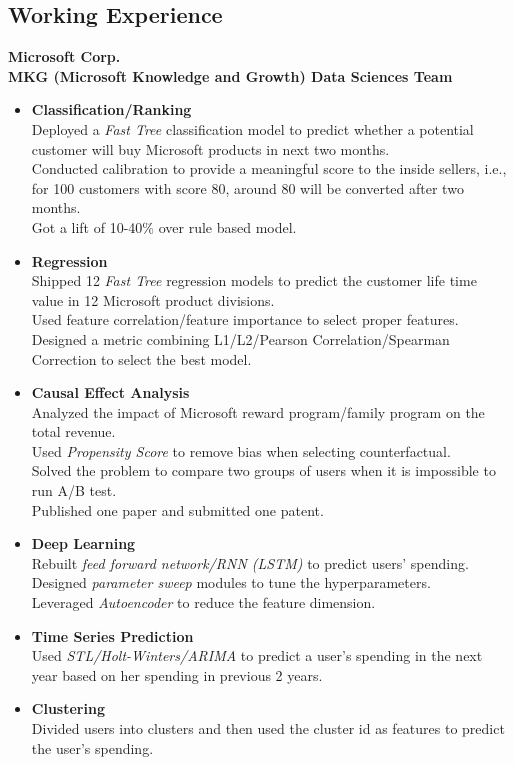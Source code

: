 \documentclass[margin,line]{res}
\begin{document}
\begin{resume}

\section{\sc Working Experience}

{\bf Microsoft Corp. }   \\ %
{\bf MKG (Microsoft Knowledge and Growth) Data Sciences Team}   \\
\begin{itemize}
  \item {\bf Classification/Ranking} \\
  Deployed a \emph{Fast Tree} classification model to predict whether a potential customer will buy Microsoft products in next two months. \\ Conducted calibration to provide a meaningful score to the inside sellers, i.e., for 100 customers with score 80, around 80 will be converted after two months. \\
  Got a lift of 10-40\% over rule based model. %
  \item {\bf Regression} \\
  Shipped 12 \emph{Fast Tree} regression models to predict the customer life time value in 12 Microsoft product divisions. \\
  Used feature correlation/feature importance to select proper features.\\
  Designed a metric combining L1/L2/Pearson Correlation/Spearman Correction to select the best model. %
  \item {\bf Causal Effect Analysis} \\
  Analyzed the impact of Microsoft reward program/family program on the total revenue. \\
  Used \emph{Propensity Score} to remove bias when selecting counterfactual. \\
  Solved the problem to compare two groups of users when it is impossible to run A/B test. \\
  Published one paper and submitted one patent.
  \item {\bf Deep Learning}\\
  Rebuilt \emph{feed forward network/RNN (LSTM)} to predict users' spending. \\
  Designed \emph{parameter sweep} modules to tune the hyperparameters. \\
  Leveraged \emph{Autoencoder} to reduce the feature dimension.
  \item {\bf Time Series Prediction} \\
  Used \emph{STL/Holt-Winters/ARIMA} to predict a user's spending in the next year based on her spending in previous 2 years.
  \item {\bf Clustering} \\
  Divided users into clusters and then used the cluster id as features to predict the user's spending.
 

\end{itemize}
\end{resume}
\end{document}
